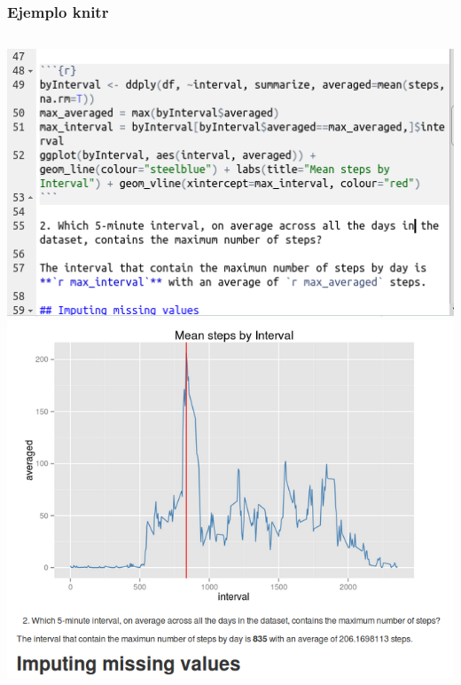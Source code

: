 \documentclass[sans serif,9pt,xcolor=dvipsnames]{beamer}%
\begin{document}
\begin{frame}
\frametitle{Ejemplo knitr}
\begin{columns}
 \hspace{1cm}
\includegraphics[scale=0.3]{imagenes/rmd_input.png}
\includegraphics[scale=0.24]{imagenes/rmd_output.png} 
\end{columns}
\end{frame}
\end{document}
